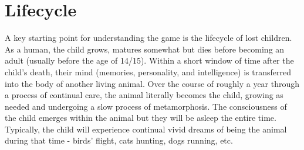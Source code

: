 \documentclass[letterpaper,serif]{rpg-module}
\begin{document}
\section{Lifecycle}

A key starting point for understanding the game is the lifecycle of lost children. As a human, the child grows, matures somewhat but dies before becoming an adult (usually before the age of 14/15). Within a short window of time after the child's death, their mind (memories, personality, and intelligence) is transferred into the body of another living animal. Over the course of roughly a year through a process of continual care, the animal literally becomes the child, growing as needed and undergoing a slow process of metamorphosis. The consciousness of the child emerges within the animal but they will be asleep the entire time. Typically, the child will experience continual vivid dreams of being the animal during that time - birds' flight, cats hunting, dogs running, etc. 
\end{document}

